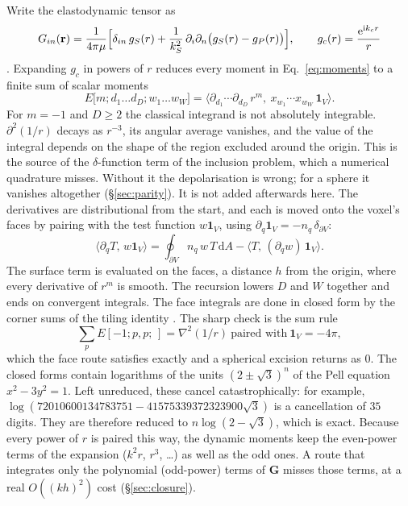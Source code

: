 \documentclass[11pt,a4paper]{article}
\newcommand{\bG}{\mathbf{G}}
\newcommand{\dd}{\mathrm{d}}
\begin{document}
Write the elastodynamic tensor as
\begin{equation}\label{eq:Gdecomp}
  G_{in}(\mathbf r)=\frac{1}{4\pi\mu}\Bigl[\delta_{in}\,g_{S}(r)
  +\frac{1}{k_S^2}\,\partial_i\partial_n\bigl(g_S(r)-g_P(r)\bigr)\Bigr],
  \qquad g_{c}(r)=\frac{\mathrm{e}^{\mathrm{i}k_cr}}{r}
\end{equation}
\citep{Kupradze1963,Aki2002}. Expanding $g_c$ in powers of $r$ reduces every moment in
Eq.~\eqref{eq:moments} to a finite sum of scalar moments
\begin{equation}\label{eq:Emoment}
  E\bigl[m;d_1\ldots d_D;w_1\ldots w_W\bigr]
  =\bigl\langle \partial_{d_1}\!\cdots\partial_{d_D}\,r^m,\ x_{w_1}\!\cdots x_{w_W}\,\mathbf 1_V\bigr\rangle .
\end{equation}
For $m=-1$ and $D\ge2$ the classical integrand is not absolutely integrable. $\partial^2(1/r)$
decays as $r^{-3}$, its angular average vanishes, and the value of the integral depends on the
shape of the region excluded around the origin. This is the source of the $\delta$-function term
of the inclusion problem, which a numerical quadrature misses. Without it the depolarisation is
wrong; for a sphere it vanishes altogether (\S\ref{sec:parity}). It is not added afterwards here. The derivatives are
distributional from the start, and each is moved onto the voxel's faces by pairing with the test
function $w\mathbf 1_V$, using $\partial_q\mathbf 1_V=-n_q\,\delta_{\partial V}$:
\begin{equation}\label{eq:peel}
  \bigl\langle \partial_qT,\,w\mathbf 1_V\bigr\rangle
  =\oint_{\partial V} n_q\,w\,T\,\dd A-\bigl\langle T,\,(\partial_qw)\,\mathbf 1_V\bigr\rangle .
\end{equation}
The surface term is evaluated on the faces, a distance $h$ from the origin, where every
derivative of $r^m$ is smooth. The recursion lowers $D$ and $W$ together and ends on convergent
integrals. The face integrals are done in closed form by the corner sums of the tiling identity \citep{NestorError2026}. The
sharp check is the sum rule
\begin{equation}\label{eq:sumrule}
  \textstyle\sum_pE[-1;p,p;\,]=\nabla^2(1/r)\ \text{paired with}\ \mathbf 1_V=-4\pi ,
\end{equation}
which the face route satisfies exactly and a spherical excision returns as $0$. The closed forms
contain logarithms of the units $(2\pm\sqrt3)^n$ of the Pell equation $x^2-3y^2=1$. Left
unreduced, these cancel catastrophically: for example, $\log(72010600134783751-41575339372323900\sqrt3)$
is a cancellation of $35$ digits. They are therefore reduced to $n\log(2-\sqrt3)$, which is
exact. Because every power of $r$ is paired this way, the dynamic moments keep the even-power terms
of the expansion ($k^2r$, $r^3$, \dots) as well as the odd ones. A route that integrates only the
polynomial (odd-power) terms of $\bG$ misses those terms, at a real $O((kh)^2)$ cost
(\S\ref{sec:closure}).
\end{document}
